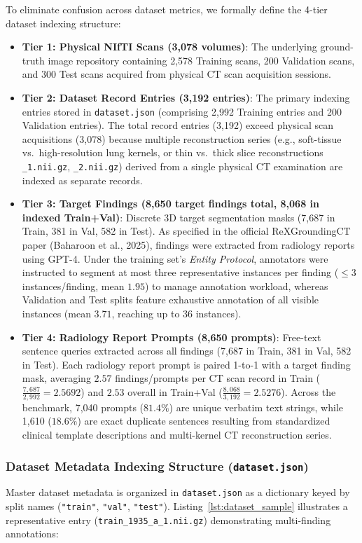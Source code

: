 \documentclass[11pt,a4paper]{article}
\begin{document}
To eliminate confusion across dataset metrics, we formally define the 4-tier dataset indexing structure:
\begin{itemize}
    \item \textbf{Tier 1: Physical NIfTI Scans (3,078 volumes)}: The underlying ground-truth image repository containing 2,578 Training scans, 200 Validation scans, and 300 Test scans acquired from physical CT scan acquisition sessions.
    \item \textbf{Tier 2: Dataset Record Entries (3,192 entries)}: The primary indexing entries stored in \texttt{dataset.json} (comprising 2,992 Training entries and 200 Validation entries). The total record entries (3,192) exceed physical scan acquisitions (3,078) because multiple reconstruction series (e.g., soft-tissue vs.\ high-resolution lung kernels, or thin vs.\ thick slice reconstructions \texttt{\_1.nii.gz}, \texttt{\_2.nii.gz}) derived from a single physical CT examination are indexed as separate records.
    \item \textbf{Tier 3: Target Findings (8,650 target findings total, 8,068 in indexed Train+Val)}: Discrete 3D target segmentation masks (7,687 in Train, 381 in Val, 582 in Test). As specified in the official ReXGroundingCT paper (Baharoon et al., 2025), findings were extracted from radiology reports using GPT-4. Under the training set's \textit{Entity Protocol}, annotators were instructed to segment at most three representative instances per finding ($\le 3$ instances/finding, mean $1.95$) to manage annotation workload, whereas Validation and Test splits feature exhaustive annotation of all visible instances (mean $3.71$, reaching up to 36 instances).
    \item \textbf{Tier 4: Radiology Report Prompts (8,650 prompts)}: Free-text sentence queries extracted across all findings (7,687 in Train, 381 in Val, 582 in Test). Each radiology report prompt is paired 1-to-1 with a target finding mask, averaging $2.57$ findings/prompts per CT scan record in Train ($\frac{7,687}{2,992} = 2.5692$) and $2.53$ overall in Train+Val ($\frac{8,068}{3,192} = 2.5276$). Across the benchmark, 7,040 prompts ($81.4\%$) are unique verbatim text strings, while 1,610 ($18.6\%$) are exact duplicate sentences resulting from standardized clinical template descriptions and multi-kernel CT reconstruction series.
\end{itemize}

\subsubsection{Dataset Metadata Indexing Structure (\texttt{dataset.json})}
Master dataset metadata is organized in \texttt{dataset.json} as a dictionary keyed by split names (\texttt{"train"}, \texttt{"val"}, \texttt{"test"}). Listing~\ref{lst:dataset_sample} illustrates a representative entry (\texttt{train\_1935\_a\_1.nii.gz}) demonstrating multi-finding annotations:
\end{document}
